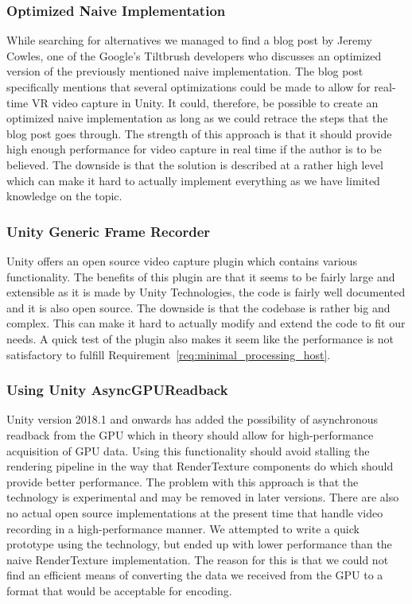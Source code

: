 \subsubsection{Optimized Naive Implementation}
While searching for alternatives we managed to find a blog post\cite{google_vrCaptureBlog} by Jeremy Cowles, one of the Google's Tiltbrush developers who discusses an optimized version of the previously mentioned naive implementation. The blog post specifically mentions that several optimizations could be made to allow for real-time VR video capture in Unity. It could, therefore, be possible to create an optimized naive implementation as long as we could retrace the steps that the blog post goes through. The strength of this approach is that it should provide high enough performance for video capture in real time if the author is to be believed. The downside is that the solution is described at a rather high level which can make it hard to actually implement everything as we have limited knowledge on the topic. 

\subsubsection{Unity Generic Frame Recorder}
Unity offers an open source video capture plugin\cite{unity_genericFrameRecprder} which contains various functionality. The benefits of this plugin are that it seems to be fairly large and extensible as it is made by Unity Technologies, the code is fairly well documented and it is also open source. The downside is that the codebase is rather big and complex. This can make it hard to actually modify and extend the code to fit our needs. A quick test of the plugin also makes it seem like the performance is not satisfactory to fulfill Requirement~\ref{req:minimal_processing_host}.

\subsubsection{Using Unity AsyncGPUReadback}
Unity version 2018.1 and onwards has added the possibility of asynchronous readback from the GPU\cite{unity_asyncReadback} which in theory should allow for high-performance acquisition of GPU data. Using this functionality should avoid stalling the rendering pipeline in the way that RenderTexture components do which should provide better performance. The problem with this approach is that the technology is experimental and may be removed in later versions. There are also no actual open source implementations at the present time that handle video recording in a high-performance manner. We attempted to write a quick prototype using the technology, but ended up with lower performance than the naive RenderTexture implementation. The reason for this is that we could not find an efficient means of converting the data we received from the GPU to a format that would be acceptable for encoding.  

